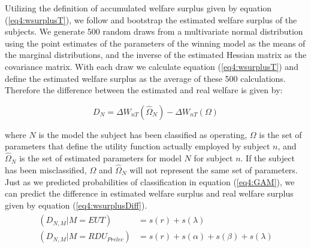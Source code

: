 \documentclass[../main.tex]{subfiles}
\begin{document}
Utilizing the definition of accumulated welfare surplus given by equation (\ref{eq4:wsurplusT}), we follow \textcite[110-111]{Harrison2016} and bootstrap the estimated welfare surplus of the subjects.
We generate 500 random draws from a multivariate normal distribution using the point estimates of the parameters of the winning model as the means of the marginal distributions, and the inverse of the estimated Hessian matrix as the covariance matrix.{\footnotemark}
With each draw we calculate equation (\ref{eq4:wsurplusT}) and define the estimated welfare surplus as the average of these 500 calculations.
Therefore the difference between the estimated and real welfare is given by:

\addtocounter{footnote}{-1}

\begin{equation}
	\label{eq4:wsurplusDiff}
	D_N = \Delta W_{nT}(\hat{\Omega}_N) - \Delta W_{nT}(\Omega)
\end{equation}

\noindent where $N$ is the model the subject has been classified as operating, $\Omega$ is the set of parameters that define the utility function actually employed by subject $n$, and $\hat{\Omega}_N$ is the set of estimated parameters for model $N$ for subject $n$.
If the subject has been misclassified, $\Omega$ and $\hat{\Omega}_N$ will not represent the same set of parameters.
Just as we predicted probabilities of classification in equation (\ref{eq4:GAM}), we can predict the difference in estimated welfare surplus and real welfare surplus given by equation (\ref{eq4:wsurplusDiff}).
\begin{align}
	\label{eq4:GAM_welfare}
	\begin{split}
		(D_{N,M} | M = EUT)                   &= s(r) + s(\lambda)\\
		(D_{N,M} | M = \mathit{RDU_{Prelec}}) &= s(r) + s(\alpha) + s(\beta) + s(\lambda)
	\end{split}
\end{align}
\end{document}
